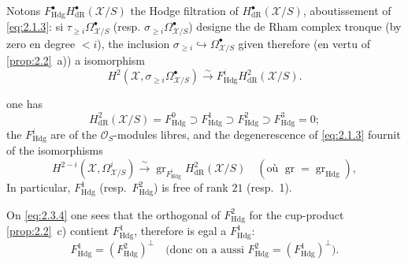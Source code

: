 \documentclass[12pt,a4paper]{article}
\theoremstyle{plain}
\theoremstyle{definition}
\theoremstyle{remark}
\DeclareMathOperator{\gr}{gr}
\newcommand{\Hdg}{\mathrm{Hdg}}
\begin{document}
Notons $F^{\bullet}_{\Hdg} H^{\bullet}_{\mathrm{dR}}(\mathcal{X}/S)$ the Hodge filtration of $H^{\bullet}_{\mathrm{dR}}(\mathcal{X}/S)$, aboutissement of \eqref{eq:2.1.3}: si $\tau_{\geqslant i} \Omega_{\mathcal{X}/S}^{\bullet}$ (resp. $\sigma_{\geqslant i} \Omega_{\mathcal{X}/S}^{\bullet}$) designe the de Rham complex tronque (by zero en degree $< i$), the inclusion $\sigma_{\geqslant i} \hookrightarrow \Omega_{\mathcal{X}/S}^{\bullet}$ given therefore (en vertu of \ref{prop:2.2}~a)) a isomorphism
\begin{equation}\label{eq:2.3.4}
H^2(\mathcal{X}, \sigma_{\geqslant i} \Omega_{\mathcal{X}/S}^{\bullet}) \xrightarrow{\sim} F^i_{\Hdg} H^2_{\mathrm{dR}}(\mathcal{X}/S).
\end{equation}

one has
\begin{equation}\label{eq:2.3.5}
H^2_{\mathrm{dR}}(\mathcal{X}/S) = F^0_{\Hdg} \supset F^1_{\Hdg} \supset F^2_{\Hdg} \supset F^3_{\Hdg} = 0;
\end{equation}
the $F^i_{\Hdg}$ are of the $\mathcal{O}_S$-modules libres, and the degenerescence of \eqref{eq:2.1.3} fournit of the isomorphisms
\begin{equation}\label{eq:2.3.6}
H^{2-i}(\mathcal{X}, \Omega^i_{\mathcal{X}/S}) \xrightarrow{\sim} \gr_{F^i_{\Hdg}} H^2_{\mathrm{dR}}(\mathcal{X}/S) \quad (\text{où } \gr = \gr_{\Hdg}),
\end{equation}
In particular, $F^1_{\Hdg}$ (resp.~$F^2_{\Hdg}$) is free of rank $21$ (resp.~1).

On \eqref{eq:2.3.4} one sees that the orthogonal of $F^2_{\Hdg}$ for the cup-product \ref{prop:2.2}~c) contient $F^1_{\Hdg}$, therefore is egal a $F^1_{\Hdg}$:
\begin{equation}\label{eq:2.3.7}
F^1_{\Hdg} = (F^2_{\Hdg})^{\perp} \quad \text{(donc on a aussi } F^2_{\Hdg} = (F^1_{\Hdg})^{\perp}).
\end{equation}
\end{document}
